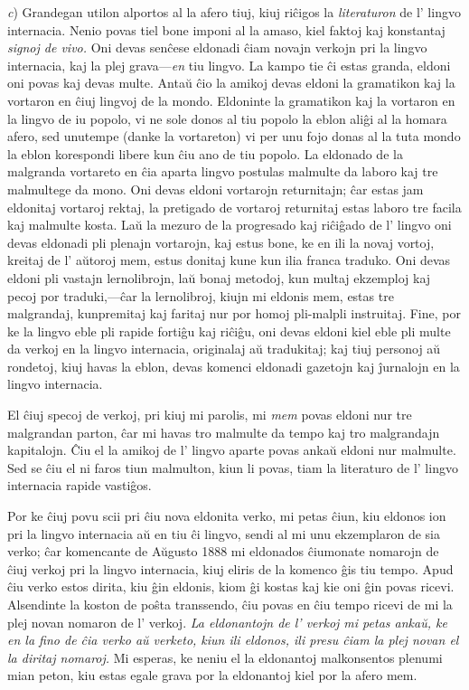 \documentclass[12pt,twoside]{book}
\begin{document}
\emph{c}) Grandegan utilon alportos al la afero tiuj, kiuj riĉigos la \emph{literaturon} de l' lingvo internacia. Nenio povas tiel bone imponi al la amaso, kiel faktoj kaj konstantaj \emph{signoj de vivo.} Oni devas senĉese eldonadi ĉiam novajn verkojn pri la lingvo internacia, kaj la plej grava—\emph{en} tiu lingvo. La kampo tie ĉi estas granda, eldoni oni povas kaj devas multe. Antaŭ ĉio la amikoj devas eldoni la gramatikon kaj la vortaron en ĉiuj lingvoj de la mondo. Eldoninte la gramatikon kaj la vortaron en la lingvo de iu popolo, vi ne sole donos al tiu popolo la eblon aliĝi al la homara afero, sed unutempe (danke la vortareton) vi per unu fojo donas al la tuta mondo la eblon korespondi libere kun ĉiu ano de tiu popolo. La eldonado de la malgranda vortareto en ĉia aparta lingvo postulas malmulte da laboro kaj tre malmultege da mono. Oni devas eldoni vortarojn returnitajn; ĉar estas jam eldonitaj vortaroj rektaj, la pretigado de vortaroj returnitaj estas laboro tre facila kaj malmulte kosta. Laŭ la mezuro de la progresado kaj riĉiĝado de l' lingvo oni devas eldonadi pli plenajn vortarojn, kaj estus bone, ke en ili la novaj vortoj, kreitaj de l' aŭtoroj mem, estus donitaj kune kun ilia franca traduko. Oni devas eldoni pli vastajn lernolibrojn, laŭ bonaj metodoj, kun multaj ekzemploj kaj pecoj por traduki,—ĉar la lernolibroj, kiujn mi eldonis mem, estas tre malgrandaj, kunpremitaj kaj faritaj nur por homoj pli-malpli instruitaj. Fine, por ke la lingvo eble pli rapide fortiĝu kaj riĉiĝu, oni devas eldoni kiel eble pli multe da verkoj en la lingvo internacia, originalaj aŭ tradukitaj; kaj tiuj personoj aŭ rondetoj, kiuj havas la eblon, devas komenci eldonadi gazetojn kaj ĵurnalojn en la lingvo internacia.

El ĉiuj specoj de verkoj, pri kiuj mi parolis, mi \emph{mem} povas eldoni nur tre malgrandan parton, ĉar mi havas tro malmulte da tempo kaj tro malgrandajn kapitalojn. Ĉiu el la amikoj de l' lingvo aparte povas ankaŭ eldoni nur malmulte. Sed se ĉiu el ni faros tiun malmulton, kiun li povas, tiam la literaturo de l' lingvo internacia rapide vastiĝos.

Por ke ĉiuj povu scii pri ĉiu nova eldonita verko, mi petas ĉiun, kiu eldonos ion pri la lingvo internacia aŭ en tiu ĉi lingvo, sendi al mi unu ekzemplaron de sia verko; ĉar komencante de Aŭgusto 1888 mi eldonados ĉiumonate nomarojn de ĉiuj verkoj pri la lingvo internacia, kiuj eliris de la komenco ĝis tiu tempo. Apud ĉiu verko estos dirita, kiu ĝin eldonis, kiom ĝi kostas kaj kie oni ĝin povas ricevi. Alsendinte la koston de poŝta transsendo, ĉiu povas en ĉiu tempo ricevi de mi la plej novan nomaron de l' verkoj. \emph{La eldonantojn de l' verkoj mi petas ankaŭ, ke en la fino de ĉia verko aŭ verketo, kiun ili eldonos, ili presu ĉiam la plej novan el la diritaj nomaroj.} Mi esperas, ke neniu el la eldonantoj malkonsentos plenumi mian peton, kiu estas egale grava por la eldonantoj kiel por la afero mem.
\end{document}

